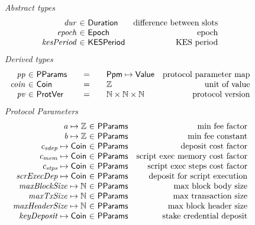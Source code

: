 \begin{figure*}[htb]
  \emph{Abstract types}
  \begin{equation*}
    \begin{array}{r@{~\in~}lr}
      \var{dur} & \Duration & \text{difference between slots}\\
      \var{epoch} & \Epoch & \text{epoch} \\
      \var{kesPeriod} & \KESPeriod & \text{KES period} \\
    \end{array}
  \end{equation*}
  \emph{Derived types}
  \begin{equation*}
    \begin{array}{r@{~\in~}l@{\qquad=\qquad}lr}
      \var{pp}
      & \PParams
      & \Ppm \mapsto \Value
      & \text{protocol parameter map}
      \\
      \var{coin}
      & \Coin
      & \Z
      & \text{unit of value}
      \\
      \var{pv}
      & \ProtVer
      & \N\times\N\times\N
      & \text{protocol version}
    \end{array}
  \end{equation*}
  \emph{Protocol Parameters}
  \begin{equation*}
      \begin{array}{r@{~\in~}lr}
        \var{a} \mapsto \Z & \PParams & \text{min fee factor}\\
        \var{b} \mapsto \Z & \PParams & \text{min fee constant}\\
        \var{c_{sdep}} \mapsto \Coin & \PParams & \text{deposit cost factor}\\
        \var{c_{mem}} \mapsto \Coin & \PParams & \text{script exec memory cost factor}\\
        \var{c_{stps}} \mapsto \Coin & \PParams & \text{script exec steps cost factor}\\
        \var{scrExecDep} \mapsto \Coin & \PParams & \text{deposit for script execution}\\
        \var{maxBlockSize} \mapsto \N & \PParams & \text{max block body size}\\
        \var{maxTxSize} \mapsto \N & \PParams & \text{max transaction size}\\
        \var{maxHeaderSize} \mapsto \N & \PParams & \text{max block header size}\\
        \var{keyDeposit} \mapsto \Coin & \PParams & \text{stake credential deposit}\\

\end{array}
\end{equation*}
\end{figure*}
